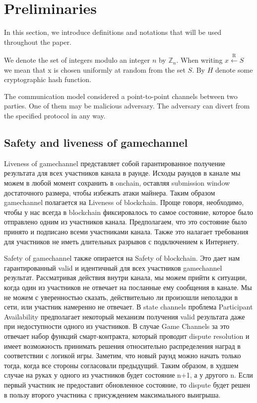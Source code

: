 \section{Preliminaries}
In this section, we introduce definitions and notations that will be used throughout the paper.

We denote the set of integers modulo an integer $n$ by $\mathbb{Z}_n$. When writing $x \xleftarrow{\text{R}} S$ we mean that x is chosen uniformly at random from the set $S$. By $H$ denote some cryptographic hash function. 

The communication model considered a point-to-point channels between two parties. One of them may be malicious adversary. The adversary can divert from the specified protocol in any way. 
	\subsection{Safety and liveness of gamechannel}

 Liveness of gamechannel представляет собой гарантированное получение результата для всех участников канала в раунде. Исходы раундов в канале мы можем в любой момент сохранить в onchain, оставляя submission window достаточного размера, чтобы избежать атаки майнера.  Таким образом gamechannel полагается на Liveness of blockchain. Проще говоря, необходимо, чтобы у нас всегда в  blockchain фиксировалось то самое состояние, которое было отправлено одним из участников канала. Предполагаем, что это состояние было принято и подписано всеми участниками канала. Также это налагает требования для участников не иметь длительных разрывов с подключением к Интернету. 


Safety of gamechannel также опирается на Safety of blockchain. Это дает нам гарантированный valid и идентичный для всех участников gamechannel результат.
Рассматривая действия внутри канала, мы можем прийти к ситуации, когда один из участников не отвечает на посланные ему сообщения в канале. Мы не можем с уверенностью сказать, действительно ли произошли неполадки в сети, или участник намеренно не отвечает. В state channels проблема Participant Availability предполагает некоторый механизм получения valid результата даже при недоступности одного из участников. В случае Game Channels за это отвечает набор функций смарт-контракта, который проводит dispute resolution и имеет возможность принимать решения относительно распределения наград в соответствии с логикой игры. Заметим, что новый раунд можно начать только тогда, когда все стороны согласовали предыдущий. Таким образом, в худшем случае на руках у одного из участников будет состояние n+1, а у другого n. Если первый участник не предоставит обновленное состояние, то dispute будет решен в пользу второго участника с присуждением максимального выигрыша.

